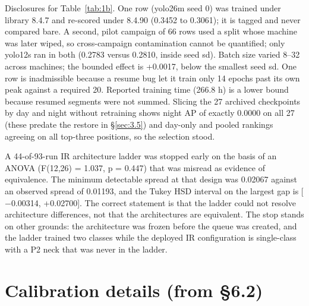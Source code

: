 \documentclass[10pt]{article}
\begin{document}
Disclosures for Table~\ref{tab:1b}. One row (yolo26m seed 0) was trained under library 8.4.7 and re-scored under 8.4.90 (0.3452 to 0.3061); it is tagged and never compared bare. A second, pilot campaign of 66 rows used a split whose machine was later wiped, so cross-campaign contamination cannot be quantified; only yolo12s ran in both (0.2783 versus 0.2810, inside seed sd). Batch size varied 8--32 across machines; the bounded effect is +0.0017, below the smallest seed sd. One row is inadmissible because a resume bug let it train only 14 epochs past its own peak against a required 20. Reported training time (266.8 h) is a lower bound because resumed segments were not summed. Slicing the 27 archived checkpoints by day and night without retraining shows night AP of exactly 0.0000 on all 27 (these predate the restore in \S\ref{sec:3.5}) and day-only and pooled rankings agreeing on all top-three positions, so the selection stood.

A 44-of-93-run IR architecture ladder was stopped early on the basis of an ANOVA (F(12,26) = 1.037, p = 0.447) that was misread as evidence of equivalence. The minimum detectable spread at that design was 0.02067 against an observed spread of 0.01193, and the Tukey HSD interval on the largest gap is [$-$0.00314, +0.02700]. The correct statement is that the ladder could not resolve architecture differences, not that the architectures are equivalent. The stop stands on other grounds: the architecture was frozen before the queue was created, and the ladder trained two classes while the deployed IR configuration is single-class with a P2 neck that was never in the ladder.

\FloatBarrier
\section{Calibration details (from \S6.2)}\label{app:F}
\end{document}
